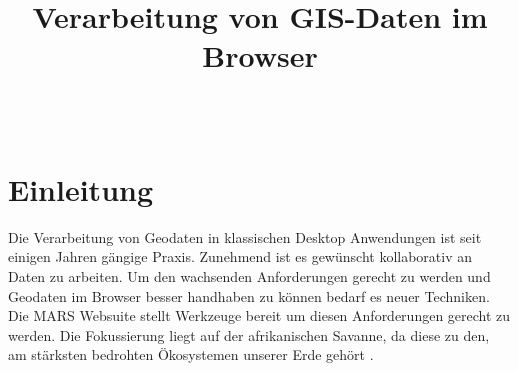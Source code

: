 \documentclass[10pt,conference,compsocconf]{IEEEtran}
\begin{document}
	\title{\textbf{\Large Verarbeitung von GIS-Daten im Browser}\\[0.2ex]}
	
	\author{
		\\
	}
	
\maketitle

\IEEEpeerreviewmaketitle



\section{Einleitung}
Die Verarbeitung von Geodaten in klassischen Desktop Anwendungen ist seit einigen Jahren gängige Praxis. Zunehmend ist es gewünscht kollaborativ an Daten zu arbeiten. Um den wachsenden Anforderungen gerecht zu werden und Geodaten im Browser besser handhaben zu können bedarf es neuer Techniken. \\
Die MARS Websuite stellt Werkzeuge bereit um diesen Anforderungen gerecht zu werden. Die Fokussierung liegt auf der afrikanischen Savanne, da diese zu den, am stärksten bedrohten Ökosystemen unserer Erde gehört \cite{climateReport}.
\end{document}
